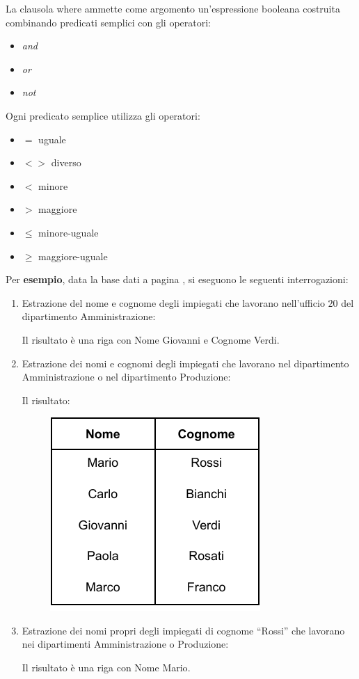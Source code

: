 \documentclass[a4paper]{article}
\newcommand{\dquotes}[1]{``#1''}
\begin{document}
	La clausola \textsf{where} ammette come argomento un'espressione booleana costruita combinando predicati semplici con gli operatori:
	\begin{itemize}
		\item \emph{and}
		\item \emph{or}
		\item \emph{not}
	\end{itemize}
	Ogni predicato semplice utilizza gli operatori:
	\begin{itemize}
		\item $=$ uguale
		\item $<>$ diverso
		\item $<$ minore
		\item $>$ maggiore
		\item $\le$ minore-uguale
		\item $\ge$ maggiore-uguale
	\end{itemize}
	Per \textcolor{Green4}{\textbf{esempio}}, data la base dati a pagina \pageref{select dbms}, si eseguono le seguenti interrogazioni:
	\begin{enumerate}
		\item Estrazione del nome e cognome degli impiegati che lavorano nell'ufficio $20$ del dipartimento Amministrazione:
		
		Il risultato è una riga con \textsf{Nome} \textsf{Giovanni} e \textsf{Cognome} \textsf{Verdi}.
		
		\item Estrazione dei nomi e cognomi degli impiegati che lavorano nel dipartimento Amministrazione o nel dipartimento Produzione:
		
		Il risultato:
		\begin{figure}[!htp]
			\centering
			\includegraphics[width=.35\textwidth]{img/where-ex2.pdf}
		\end{figure}\newpage
		
		\item Estrazione dei nomi propri degli impiegati di cognome \dquotes{Rossi} che lavorano nei dipartimenti Amministrazione o Produzione:
		
		Il risultato è una riga con \textsf{Nome} \textsf{Mario}.
	\end{enumerate}
\end{document}
